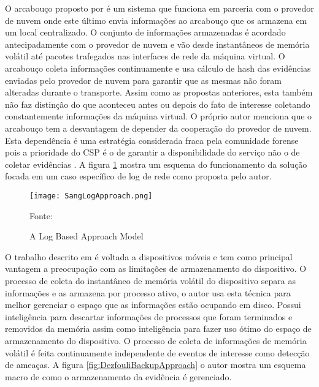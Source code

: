O arcabouço proposto por \cite{SangLogApproach:2013} é um sistema que funciona em parceria com o provedor de nuvem onde este último envia informações ao arcabouço que os armazena em um local centralizado.
%
O conjunto de informações armazenadas é acordado antecipadamente com o provedor de nuvem e vão desde instantâneos de memória volátil até pacotes trafegados nas interfaces de rede da máquina virtual.
%
O arcabouço coleta informações continuamente e usa cálculo de hash das evidências enviadas pelo provedor de nuvem para garantir que as mesmas não foram alteradas durante o transporte.
%
Assim como as propostas anteriores, esta também não faz distinção do que aconteceu antes ou depois do fato de interesse coletando constantemente informações da máquina virtual.
%
O próprio autor menciona que o arcabouço tem a desvantagem de depender da cooperação do provedor de nuvem. Esta dependência é uma estratégia considerada fraca pela comunidade forense pois a prioridade do CSP é o de garantir a disponibilidade do serviço não o de coletar evidências \cite{ClarkeReviewOfChallenges2015}.
%
A figura \ref{fig:SangLogApproach} mostra um esquema do funcionamento da solução focada em um caso específico de log de rede como proposta pelo autor.

\begin{figure}[htb!]
\footnotesize
\caption{A Log Based Approach Model}
\texttt{[image: SangLogApproach.png]}
\centering
\label{fig:SangLogApproach}
\begin{center}
Fonte: \cite{SangLogApproach:2013} 
\end{center}
\end{figure}

O trabalho descrito em \cite{DezfouliBackupApproach:2012} é voltada a dispositivos móveis e tem como principal vantagem a preocupação com as limitações de armazenamento do dispositivo.
%
O processo de coleta do instantâneo de memória volátil do dispositivo separa as informações e as armazena por processo ativo, o autor usa esta técnica para melhor gerenciar o espaço que as informações estão ocupando em disco. 
%
Possui inteligência para descartar informações de processos que foram terminados e removidos da memória assim como inteligência para fazer uso ótimo do espaço de armazenamento do dispositivo.
%
O processo de coleta de informações de memória volátil é feita continuamente independente de eventos de interesse como detecção de ameaças.
%
A figura \ref{fig:DezfouliBackupApproach} o autor mostra um esquema macro de como o armazenamento da evidência é gerenciado.

